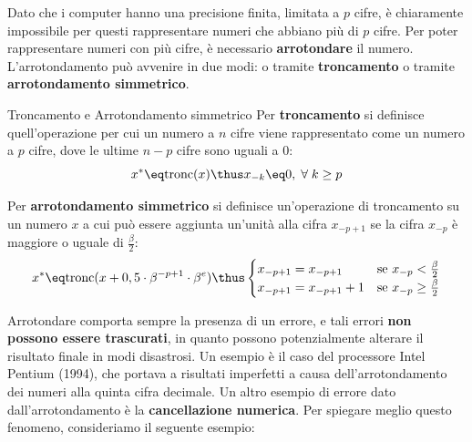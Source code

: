 Dato che i computer hanno una precisione finita, limitata a $p$ cifre, è chiaramente impossibile per questi rappresentare numeri che abbiano più di $p$ cifre. Per poter rappresentare numeri con più cifre, è necessario \textbf{arrotondare} il numero. L'arrotondamento può avvenire in due modi: o tramite \textbf{troncamento} o tramite \textbf{arrotondamento simmetrico}.

\begin{definition}{Troncamento e Arrotondamento simmetrico}
    Per \textbf{troncamento} si definisce quell'operazione per cui un numero a $n$ cifre viene rappresentato come un numero a $p$ cifre, dove le ultime $n - p$ cifre sono uguali a 0:
    \[ x^* \eq \text{tronc}(x) \thus x_{-k} \eq 0, \; \forall \; k \geq p \]

    Per \textbf{arrotondamento simmetrico} si definisce un'operazione di troncamento su un numero $x$ a cui può essere aggiunta un'unità alla cifra $x_{-p + 1}$ se la cifra $x_{-p}$ è maggiore o uguale di $\frac{\beta}{2}$:
    \[ x^* \eq \text{tronc}(x + 0,5 \cdot \beta^{-p+1} \cdot \beta^e) \thus \begin{cases}
        x_{-p + 1} = x_{-p + 1} & \text{se } x_{-p} < \frac{\beta}{2} \\
        x_{-p + 1} = x_{-p + 1} + 1 & \text{se } x_{-p} \geq \frac{\beta}{2}
    \end{cases}\]
\end{definition}

Arrotondare comporta sempre la presenza di un errore, e tali errori \textbf{non possono essere trascurati}, in quanto possono potenzialmente alterare il risultato finale in modi disastrosi. Un esempio è il caso del processore Intel Pentium (1994), che portava a risultati imperfetti a causa dell'arrotondamento dei numeri alla quinta cifra decimale.
\nl
Un altro esempio di errore dato dall'arrotondamento è la \textbf{cancellazione numerica}. Per spiegare meglio questo fenomeno, consideriamo il seguente esempio:

